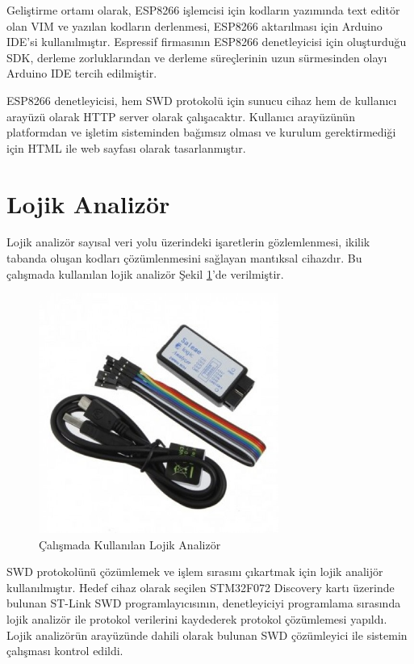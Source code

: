 Geliştirme ortamı olarak, ESP8266 işlemcisi için kodların yazımında text editör olan VIM ve yazılan kodların derlenmesi, ESP8266 aktarılması için Arduino \acrfull{IDE}'si kullanılmıştır.
Espressif firmasının ESP8266 denetleyicisi için oluşturduğu \acrfull{SDK}, derleme zorluklarından ve derleme süreçlerinin uzun sürmesinden olayı Arduino IDE tercih edilmiştir.

ESP8266 denetleyicisi, hem SWD protokolü için sunucu cihaz hem de kullanıcı arayüzü olarak HTTP server olarak çalışacaktır. Kullanıcı arayüzünün platformdan ve işletim sisteminden bağımsız olması ve kurulum gerektirmediği için HTML ile web sayfası olarak tasarlanmıştır.

\section{Lojik Analizör}

Lojik analizör sayısal veri yolu üzerindeki işaretlerin gözlemlenmesi, ikilik tabanda oluşan kodları çözümlenmesini sağlayan mantıksal cihazdır. Bu çalışmada kullanılan lojik analizör Şekil \ref{fig:lojikAna}'de verilmiştir.

\begin{figure}[h]
\centering
\includegraphics[width=0.7\textwidth]{gorseller/lojikAna}
\caption{Çalışmada Kullanılan Lojik Analizör}\label{fig:lojikAna}
\end{figure}

SWD protokolünü çözümlemek ve işlem sırasını çıkartmak için lojik analijör kullanılmıştır. Hedef cihaz olarak seçilen STM32F072 Discovery kartı üzerinde bulunan ST-Link SWD programlayıcısının, denetleyiciyi programlama sırasında lojik analizör ile protokol verilerini kaydederek protokol çözümlemesi yapıldı. Lojik analizörün arayüzünde dahili olarak bulunan SWD çözümleyici ile sistemin çalışması kontrol edildi.

